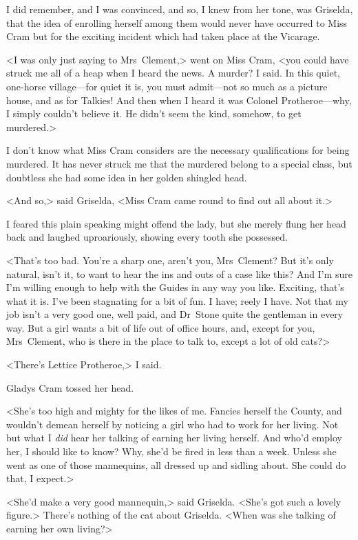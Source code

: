 I did remember, and I was convinced, and so, I knew from her tone, was Griselda, that the idea of enrolling herself among them would never have occurred to Miss Cram but for the exciting incident which had taken place at the Vicarage.

<I was only just saying to Mrs~Clement,> went on Miss Cram, <you could have struck me all of a heap when I heard the news. A murder? I said. In this quiet, one-horse village—for quiet it is, you must admit—not so much as a picture house, and as for Talkies! And then when I heard it was Colonel Protheroe—why, I simply couldn't believe it. He didn't seem the kind, somehow, to get murdered.>

I don't know what Miss Cram considers are the necessary qualifications for being murdered. It has never struck me that the murdered belong to a special class, but doubtless she had some idea in her golden shingled head.

<And so,> said Griselda, <Miss Cram came round to find out all about it.>

I feared this plain speaking might offend the lady, but she merely flung her head back and laughed uproariously, showing every tooth she possessed.

<That's too bad. You're a sharp one, aren't you, Mrs~Clement? But it's only natural, isn't it, to want to hear the ins and outs of a case like this? And I'm sure I'm willing enough to help with the Guides in any way you like. Exciting, that's what it is. I've been stagnating for a bit of fun. I have; reely I have. Not that my job isn't a very good one, well paid, and Dr~Stone quite the gentleman in every way. But a girl wants a bit of life out of office hours, and, except for you, Mrs~Clement, who is there in the place to talk to, except a lot of old cats?>

<There's Lettice Protheroe,> I said.

Gladys Cram tossed her head.

<She's too high and mighty for the likes of me. Fancies herself the County, and wouldn't demean herself by noticing a girl who had to work for her living. Not but what I \emph{did} hear her talking of earning her living herself. And who'd employ her, I should like to know? Why, she'd be fired in less than a week. Unless she went as one of those mannequins, all dressed up and sidling about. She could do that, I expect.>

<She'd make a very good mannequin,> said Griselda. <She's got such a lovely figure.> There's nothing of the cat about Griselda. <When was she talking of earning her own living?>

